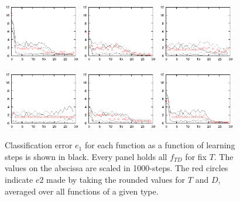 \documentclass[useAMS,usenatbib]{mn2e}
\begin{document}
\begin{figure}
  \begin{center}
   \includegraphics[width=0.3\textwidth]{fig/err/e1.eps}
   \includegraphics[width=0.3\textwidth]{fig/err/e2.eps}
   \includegraphics[width=0.3\textwidth]{fig/err/e3.eps}
  \end{center}
  \begin{center}
   \includegraphics[width=0.3\textwidth]{fig/err/e4.eps}
   \includegraphics[width=0.3\textwidth]{fig/err/e5.eps}
   \includegraphics[width=0.3\textwidth]{fig/err/e6.eps}
  \end{center}
  \caption{\label{fig:e12nit}Classification error $e_1$ for each
    function as a function of learning steps is shown in black. Every
    panel holds all $f_{TD}$ for fix $T$. The values on the abscissa
    are scaled in 1000-steps. The red circles indicate $e2$ made by
    taking the rounded values for $T$ and $D$, averaged over all
    functions of a given type.}
\end{figure}
\end{document}
